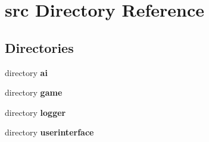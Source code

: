 \section{src Directory Reference}
\label{dir_68267d1309a1af8e8297ef4c3efbcdba}
\subsection*{Directories}
\begin{DoxyCompactItemize}
\item 
directory {\bf ai}
\item 
directory {\bf game}
\item 
directory {\bf logger}
\item 
directory {\bf userinterface}
\end{DoxyCompactItemize}
